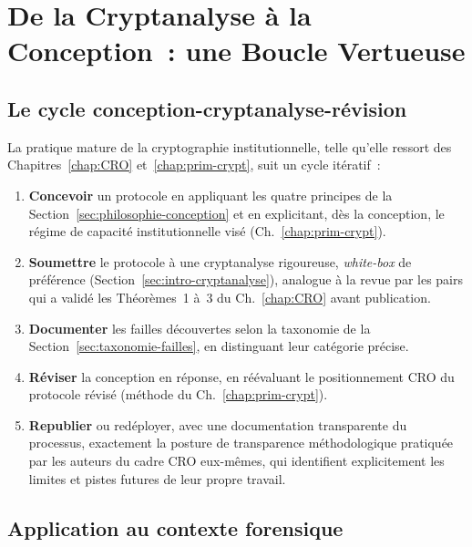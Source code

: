 \section{De la Cryptanalyse à la Conception~: une Boucle Vertueuse}
\label{sec:boucle-vertueuse}

\subsection{Le cycle conception-cryptanalyse-révision}

La pratique mature de la cryptographie institutionnelle, telle
qu'elle ressort des Chapitres~\ref{chap:CRO} et~\ref{chap:prim-crypt},
suit un cycle itératif~:

\begin{enumerate}
    \item \textbf{Concevoir} un protocole en appliquant les quatre
          principes de la Section~\ref{sec:philosophie-conception}
          et en explicitant, dès la conception, le régime de
          capacité institutionnelle visé (Ch.~\ref{chap:prim-crypt}).
    \item \textbf{Soumettre} le protocole à une cryptanalyse
          rigoureuse, \textit{white-box} de préférence
          (Section~\ref{sec:intro-cryptanalyse}), analogue à la
          revue par les pairs qui a validé les Théorèmes~1 à~3 du
          Ch.~\ref{chap:CRO} avant publication.
    \item \textbf{Documenter} les failles découvertes selon la
          taxonomie de la Section~\ref{sec:taxonomie-failles}, en
          distinguant leur catégorie précise.
    \item \textbf{Réviser} la conception en réponse, en
          réévaluant le positionnement CRO du protocole révisé
          (méthode du Ch.~\ref{chap:prim-crypt}).
    \item \textbf{Republier} ou redéployer, avec une documentation
          transparente du processus, exactement la posture de
          transparence méthodologique pratiquée par les auteurs
          du cadre CRO eux-mêmes, qui identifient explicitement
          les limites et pistes futures de leur propre travail.
\end{enumerate}

\subsection{Application au contexte forensique}

